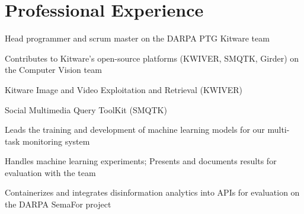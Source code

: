 \documentclass[]{resume-formatting}
\begin{document}
%
%

%
%


%
%

\begin{minipage}[t]{0.7\textwidth} 


\section{Professional Experience}

\sectionsep
\begin{tightemize}
\item Head programmer and scrum master on the DARPA PTG Kitware team
\item Contributes to Kitware’s open-source platforms (KWIVER, SMQTK, Girder) on the Computer Vision team
    \vspace{3pt}
    \begin{tightemize}
    \item Kitware Image and Video Exploitation and Retrieval (KWIVER)
    \item Social Multimedia Query ToolKit (SMQTK)
    \end{tightemize}
    \vspace{5pt}
\item Leads the training and development of machine learning models for our multi-task monitoring system 
\item Handles machine learning experiments; Presents and documents results for evaluation with the team
\item Containerizes and integrates disinformation analytics into APIs for evaluation on the DARPA SemaFor project

\end{tightemize}
\sectionsep


\end{minipage}
\end{document}
